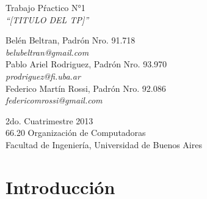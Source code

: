 \documentclass{article}
\begin{document}
\setcounter{page}{5}

\begin{titlepage}
	\vspace*{\fill}
	\begin{center}
		\huge{Trabajo Pŕactico N°1} \\
		\medskip
		\Huge \textit{``[TITULO DEL TP]''} \\
		
		\bigskip\bigskip\bigskip\bigskip\bigskip

		\Large Belén Beltran, Padrón Nro. 91.718 \\
		\large \textit{belubeltran@gmail.com} \\ \medskip
		\Large Pablo Ariel Rodriguez, Padrón Nro. 93.970 \\
		\large \textit{prodriguez@fi.uba.ar} \\ \medskip
		\Large Federico Martín Rossi, Padrón Nro. 92.086 \\
		\large \textit{federicomrossi@gmail.com} \\

		\bigskip\bigskip\bigskip\bigskip\bigskip\bigskip\bigskip

		\large 2do. Cuatrimestre 2013 \\ \smallskip
		\large 66.20 Organización de Computadoras \\ \smallskip
		\large Facultad de Ingeniería, Universidad de Buenos Aires \\ \smallskip

		\date{}
	\end{center}
	\vspace*{\fill}
\end{titlepage}

\newpage
\newpage \textit{}
\newpage



\tableofcontents
\newpage \textit{}
\newpage
{}




\section{Introducción}
	
\end{document}
